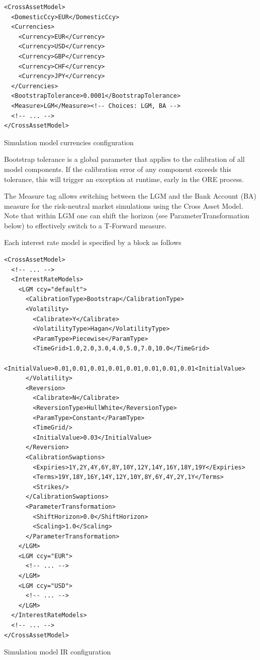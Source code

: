 \documentclass[12pt, a4paper]{article}
\begin{document}
{{\begin{listing}[H]
\begin{verbatim}
<CrossAssetModel>
  <DomesticCcy>EUR</DomesticCcy>
  <Currencies>
    <Currency>EUR</Currency>
    <Currency>USD</Currency>
    <Currency>GBP</Currency>
    <Currency>CHF</Currency>
    <Currency>JPY</Currency>
  </Currencies>
  <BootstrapTolerance>0.0001</BootstrapTolerance>
  <Measure>LGM</Measure><!-- Choices: LGM, BA -->
  <!-- ... -->
</CrossAssetModel>
\end{verbatim}
\caption{Simulation model currencies configuration}
\label{lst:simulation_model_currencies_configuration}
\end{listing}
 
Bootstrap tolerance is a global parameter that applies to the calibration of all model components. If the calibration
error of any component exceeds this tolerance, this will trigger an exception at runtime, early in the ORE process.

The Measure tag allows switching between the LGM and the Bank Account (BA) measure for the risk-neutral market simulations using the Cross Asset Model. Note that within LGM one can shift the horizon (see ParameterTransformation below) to effectively switch to a T-Forward measure. 
 
\medskip

Each interest rate model is specified by a block as follows

\begin{listing}[H]
\begin{verbatim}
<CrossAssetModel>	
  <!-- ... -->
  <InterestRateModels>
    <LGM ccy="default">
      <CalibrationType>Bootstrap</CalibrationType>
      <Volatility>
        <Calibrate>Y</Calibrate>
        <VolatilityType>Hagan</VolatilityType>
        <ParamType>Piecewise</ParamType>
        <TimeGrid>1.0,2.0,3.0,4.0,5.0,7.0,10.0</TimeGrid>
        <InitialValue>0.01,0.01,0.01,0.01,0.01,0.01,0.01,0.01<InitialValue>
      </Volatility>
      <Reversion>
        <Calibrate>N</Calibrate>
        <ReversionType>HullWhite</ReversionType>
        <ParamType>Constant</ParamType>
        <TimeGrid/>
        <InitialValue>0.03</InitialValue>
      </Reversion>
      <CalibrationSwaptions>
        <Expiries>1Y,2Y,4Y,6Y,8Y,10Y,12Y,14Y,16Y,18Y,19Y</Expiries>
        <Terms>19Y,18Y,16Y,14Y,12Y,10Y,8Y,6Y,4Y,2Y,1Y</Terms>
        <Strikes/>
      </CalibrationSwaptions>
      <ParameterTransformation>
        <ShiftHorizon>0.0</ShiftHorizon>
        <Scaling>1.0</Scaling>
      </ParameterTransformation>
    </LGM>
    <LGM ccy="EUR">
      <!-- ... -->
    </LGM>
    <LGM ccy="USD">
      <!-- ... -->
    </LGM>
  </InterestRateModels>	
  <!-- ... -->		
</CrossAssetModel>
\end{verbatim}
\caption{Simulation model IR configuration}
\label{lst:simulation_model_ir_configuration}
\end{listing}

}}
\end{document}
